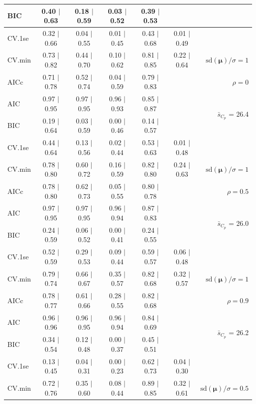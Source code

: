 \documentclass[12pt]{article}
\newcommand{\mr}[1]{\mathrm{#1}}
\newcommand{\bm}[1]{\mathbf{#1}}
\begin{document}
\begin{table}[p]
\begin{center}
\begin{tabular}{l*{5}{c}|r}
BIC & 0.40 $\mid$ 0.63 & 0.18 $\mid$ 0.59 & 0.03 $\mid$ 0.52 & 0.39 $\mid$ 0.53 & & \\
 \hline 
CV.1se & 0.32 $\mid$ 0.66 & 0.04 $\mid$ 0.55 & 0.01 $\mid$ 0.45 & 0.43 $\mid$ 0.68 & 0.01 $\mid$ 0.49 &\\
CV.min & 0.73 $\mid$ 0.82 & 0.44 $\mid$ 0.70 & 0.10 $\mid$ 0.62 & 0.81 $\mid$ 0.85 & 0.22 $\mid$ 0.64 &  $\mr{sd}(\bm{\mu})/\sigma=1$ \\
AICc & 0.71 $\mid$ 0.78 & 0.52 $\mid$ 0.74 & 0.04 $\mid$ 0.59 & 0.79 $\mid$ 0.83 & & $\rho=0$ \\
AIC & 0.97 $\mid$ 0.95 & 0.97 $\mid$ 0.95 & 0.96 $\mid$ 0.93 & 0.85 $\mid$ 0.87 & & \multirow{2}{*}{$\bar{s}_{C_p}$ = 26.4} \\
BIC & 0.19 $\mid$ 0.64 & 0.03 $\mid$ 0.59 & 0.00 $\mid$ 0.46 & 0.14 $\mid$ 0.57 & & \\
 \hline 
CV.1se & 0.44 $\mid$ 0.64 & 0.13 $\mid$ 0.56 & 0.02 $\mid$ 0.44 & 0.53 $\mid$ 0.63 & 0.01 $\mid$ 0.48 &\\
CV.min & 0.78 $\mid$ 0.80 & 0.60 $\mid$ 0.72 & 0.16 $\mid$ 0.59 & 0.82 $\mid$ 0.80 & 0.24 $\mid$ 0.63 &  $\mr{sd}(\bm{\mu})/\sigma=1$ \\
AICc & 0.78 $\mid$ 0.80 & 0.62 $\mid$ 0.73 & 0.05 $\mid$ 0.55 & 0.80 $\mid$ 0.78 & & $\rho=0.5$ \\
AIC & 0.97 $\mid$ 0.95 & 0.97 $\mid$ 0.95 & 0.96 $\mid$ 0.94 & 0.87 $\mid$ 0.83 & & \multirow{2}{*}{$\bar{s}_{C_p}$ = 26.0} \\
BIC & 0.24 $\mid$ 0.59 & 0.06 $\mid$ 0.52 & 0.00 $\mid$ 0.41 & 0.24 $\mid$ 0.55 & & \\
 \hline 
CV.1se & 0.52 $\mid$ 0.59 & 0.29 $\mid$ 0.53 & 0.09 $\mid$ 0.44 & 0.59 $\mid$ 0.57 & 0.06 $\mid$ 0.48 &\\
CV.min & 0.79 $\mid$ 0.74 & 0.66 $\mid$ 0.67 & 0.35 $\mid$ 0.57 & 0.82 $\mid$ 0.68 & 0.32 $\mid$ 0.57 &  $\mr{sd}(\bm{\mu})/\sigma=1$ \\
AICc & 0.78 $\mid$ 0.77 & 0.61 $\mid$ 0.66 & 0.28 $\mid$ 0.55 & 0.82 $\mid$ 0.68 & & $\rho=0.9$ \\
AIC & 0.96 $\mid$ 0.96 & 0.96 $\mid$ 0.95 & 0.96 $\mid$ 0.94 & 0.84 $\mid$ 0.69 & & \multirow{2}{*}{$\bar{s}_{C_p}$ = 26.2} \\
BIC & 0.34 $\mid$ 0.54 & 0.12 $\mid$ 0.48 & 0.00 $\mid$ 0.37 & 0.45 $\mid$ 0.51 & & \\
 \hline 
CV.1se & 0.13 $\mid$ 0.45 & 0.04 $\mid$ 0.31 & 0.00 $\mid$ 0.23 & 0.62 $\mid$ 0.73 & 0.04 $\mid$ 0.30 &\\
CV.min & 0.72 $\mid$ 0.76 & 0.35 $\mid$ 0.60 & 0.08 $\mid$ 0.44 & 0.89 $\mid$ 0.85 & 0.32 $\mid$ 0.61 &  $\mr{sd}(\bm{\mu})/\sigma=0.5$ \\

\end{tabular}
\end{center}
\end{table}
\end{document}
